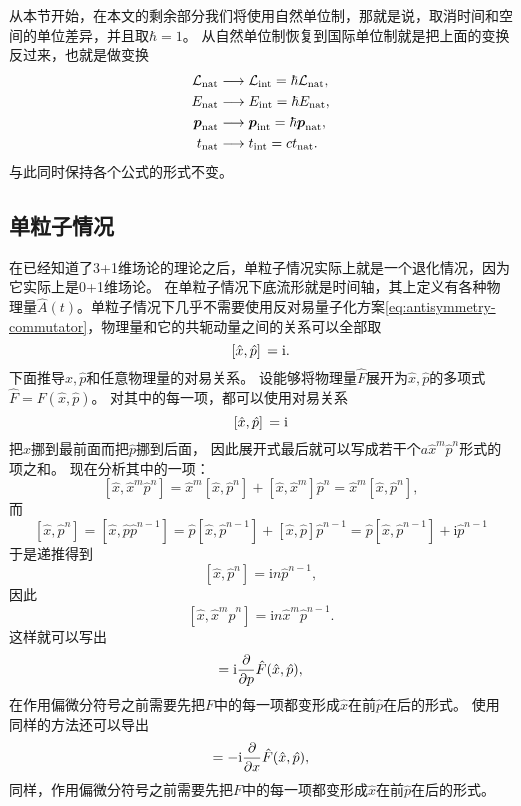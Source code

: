 \documentclass[UTF8, a4paper]{ctexart}
\newcommand*{\ii}{\mathrm{i}}
\begin{document}
从本节开始，在本文的剩余部分我们将使用自然单位制，那就是说，取消时间和空间的单位差异，并且取$\hbar = 1$。
从自然单位制恢复到国际单位制就是把上面的变换反过来，也就是做变换
\[
    \begin{aligned}
        \mathcal{L}_\text{nat} &\longrightarrow \mathcal{L}_\text{int} = \hbar \mathcal{L}_\text{nat}, \\
        E_\text{nat} &\longrightarrow E_\text{int} = \hbar E_\text{nat} , \\
        \vb*{p}_\text{nat} &\longrightarrow \vb*{p}_\text{int} = \hbar \vb*{p}_\text{nat}, \\
        t_\text{nat} &\longrightarrow t_\text{int} = c t_\text{nat}.
    \end{aligned}
\]
与此同时保持各个公式的形式不变。

\subsection{单粒子情况}

在已经知道了3+1维场论的理论之后，单粒子情况实际上就是一个退化情况，因为它实际上是0+1维场论。
在单粒子情况下底流形就是时间轴，其上定义有各种物理量$\hat{A}(t)$。单粒子情况下几乎不需要使用反对易量子化方案\eqref{eq:antisymmetry-commutator}，物理量和它的共轭动量之间的关系可以全部取
\begin{equation}
    \comm*{\hat{x}}{\hat{p}} = \ii.
\end{equation}
下面推导$\hat{x}, \hat{p}$和任意物理量的对易关系。
设能够将物理量$\hat{F}$展开为$\hat{x}, \hat{p}$的多项式$\hat{F} = F(\hat{x}, \hat{p})$。
对其中的每一项，都可以使用对易关系
\[
    \comm*{\hat{x}}{\hat{p}} = \ii
\]
把$\hat{x}$挪到最前面而把$\hat{p}$挪到后面，
因此展开式最后就可以写成若干个$a \hat{x}^m \hat{p}^n$形式的项之和。
现在分析其中的一项：
\[
    [\hat{x}, \hat{x}^m \hat{p}^n] = \hat{x}^m [\hat{x}, \hat{p}^n] + [\hat{x}, \hat{x}^m] \hat{p}^n = \hat{x}^m [\hat{x}, \hat{p}^n],
\]
而
\[
    [\hat{x}, \hat{p}^n] = [\hat{x}, \hat{p} \hat{p}^{n-1}] = 
    \hat{p} [\hat{x}, \hat{p}^{n-1}] + [\hat{x}, \hat{p}] \hat{p}^{n-1} = \hat{p} [\hat{x}, \hat{p}^{n-1}] + \ii \hat{p}^{n-1}
\]
于是递推得到
\[
    [\hat{x}, \hat{p}^n] = \ii n \hat{p}^{n-1},
\]
因此
\[
    [\hat{x}, \hat{x}^m \hat{p}^n] = \ii n \hat{x}^m \hat{p}^{n-1}.
\]
这样就可以写出
\begin{equation}
    [\hat{x}, \hat{F}(\hat{x}, \hat{p})] = \ii \pdv{p} \hat{F}(\hat{x}, \hat{p}),
\end{equation}
在作用偏微分符号之前需要先把$F$中的每一项都变形成$\hat{x}$在前$\hat{p}$在后的形式。
使用同样的方法还可以导出
\begin{equation}
    [\hat{p}, \hat{F}(\hat{x}, \hat{p})] = - \ii \pdv{x} \hat{F}(\hat{x}, \hat{p}),
\end{equation}
同样，作用偏微分符号之前需要先把$F$中的每一项都变形成$\hat{x}$在前$\hat{p}$在后的形式。
\end{document}
